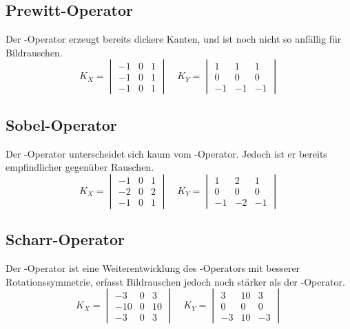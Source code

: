 \subsection*{Prewitt-Operator}
Der -Operator \cite[S.~108]{prewitt1070} erzeugt bereits dickere Kanten, und ist noch nicht so anfällig für Bildrauschen.
\begin{equation}
  K_X = \begin{vmatrix}
    -1 & 0 & 1 \\
    -1 & 0 & 1 \\
    -1 & 0 & 1
  \end{vmatrix}
  \quad
  K_Y = \begin{vmatrix}
     1 &  1 &  1 \\
     0 &  0 &  0 \\
    -1 & -1 & -1
  \end{vmatrix}
\end{equation}

\subsection*{Sobel-Operator}
Der -Operator \cite[Kapitel~5.2]{davies2012} unterscheidet sich kaum vom -Operator.
Jedoch ist er bereits empfindlicher gegenüber Rauschen.
\begin{equation}
  K_X = \begin{vmatrix}
    -1 & 0 & 1 \\
    -2 & 0 & 2 \\
    -1 & 0 & 1
  \end{vmatrix}
  \quad
  K_Y = \begin{vmatrix}
     1 &  2 &  1 \\
     0 &  0 &  0 \\
    -1 & -2 & -1
  \end{vmatrix}
\end{equation}

\subsection*{Scharr-Operator}
Der -Operator \cite[Kapitel~9.3]{scharr2000} ist eine Weiterentwicklung des -Operators mit besserer Rotationssymmetrie, erfasst Bildrauschen jedoch noch stärker als der -Operator.
\begin{equation}
  K_X = \begin{vmatrix}
     -3 & 0 &  3 \\
    -10 & 0 & 10 \\
     -3 & 0 &  3
  \end{vmatrix}
  \quad
  K_Y = \begin{vmatrix}
     3 & 10 &  3 \\
     0 &  0 &  0 \\
    -3 & 10 & -3
  \end{vmatrix}
\end{equation}


